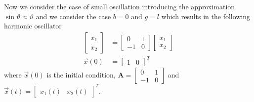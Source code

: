 \documentclass[11pt,a4paper,oneside]{book}
\numberwithin{equation}{section}
\theoremstyle{it}
\theoremstyle{definition}
\begin{document}
Now we consider the case of small oscillation introducing the approximation 
$\sin\vartheta\approx\vartheta$ and we consider the case $b=0$ and $g=l$ which 
results in the following harmonic oscillator
\begin{equation}
	\begin{aligned}
		\begin{bmatrix} \dot{x}_1 \\ \dot{x}_2 \end{bmatrix} &= \begin{bmatrix} 
		0 & 1 \\ -1 & 0 \end{bmatrix} \begin{bmatrix} {x}_1 \\ {x}_2 
		\end{bmatrix} \\[6pt]
		\vec{x}(0) &= \begin{bmatrix} 1 & 0 \end{bmatrix}^T
	\end{aligned}
\end{equation}
where $\vec{x}(0)$ is the initial condition, $\mathbf{A} = \begin{bmatrix} 0 & 
1 \\ -1 & 0 \end{bmatrix}$ and $\vec{x}(t)= \begin{bmatrix} x_1(t) & x_2(t) 
\end{bmatrix}^T$.\\
\end{document}
